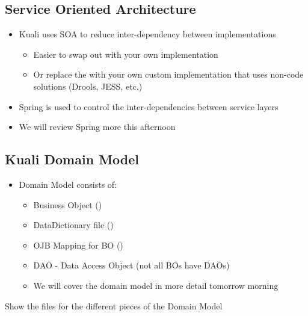\begin{ifhtml}
\begin{s5slide}
        \section{Service Oriented Architecture}
        \begin{ifhtml}
            \begin{itemize}
                \item Kuali uses SOA to reduce inter-dependency between implementations
                \begin{itemize}
                    \item Easier to swap out  with your own implementation
                    \item Or replace the  with your own custom implementation that uses non-code solutions (Drools, JESS, etc.)
                \end{itemize}
                \item Spring is used to control the inter-dependencies between service layers
                \item We will review Spring more this afternoon
            \end{itemize}
        \end{ifhtml} 
    \end{s5slide}
    \begin{s5slide}
        \section{Kuali Domain Model}
        \begin{ifhtml}
            \begin{itemize}
                \item Domain Model consists of:
                \begin{itemize}
                    \item Business Object ()
                    \item DataDictionary file ()
                    \item OJB Mapping for BO ()
                    \item DAO - Data Access Object (not all BOs have DAOs)
                    \item We will cover the domain model in more detail tomorrow morning
                    
                \end{itemize}
            \end{itemize}
        \end{ifhtml}
        \begin{s5notes}
            Show the files for the different pieces of the Domain Model
        \end{s5notes} 
    \end{s5slide}
    
\end{ifhtml}